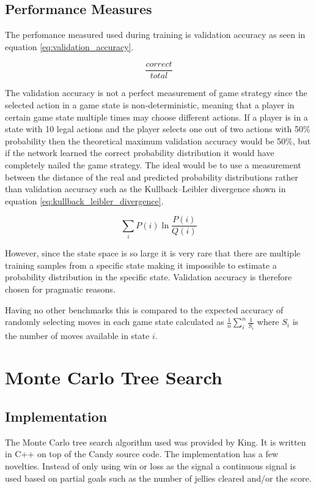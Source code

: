 \documentclass{kththesis}
\begin{document}
\subsection{Performance Measures}
The perfomance measured used during training is validation accuracy as seen in equation \ref{eq:validation_accuracy}. 

\begin{equation}
\label{eq:validation_accuracy}
\frac{correct}{total}
\end{equation}

The validation accuracy is not a perfect measurement of game strategy since the selected action in a game state is non-deterministic, meaning that a player in  certain game state multiple times may choose different actions. If a player is in a state with 10 legal actions and the player selects one out of two actions with 50\% probability then the theoretical maximum validation accuracy would be 50\%, but if the network learned the correct probability distribution it would have completely nailed the game strategy. The ideal would be to use a measurement between the distance of the real and predicted probability distributions rather than validation accuracy such as the Kullback–Leibler divergence shown in equation \ref{eq:kullback_leibler_divergence}.

\begin{equation}
\label{eq:kullback_leibler_divergence}
\sum_i P(i)\ln\frac{P(i)}{Q(i)}
\end{equation}

However, since the state space is so large it is very rare that there are multiple training samples from a specific state making it impossible to estimate a probability distribution in the specific state. Validation accuracy is therefore chosen for pragmatic reasons.

Having no other benchmarks this  is compared to the expected accuracy of randomly selecting moves in each game state calculated as $\frac{1}{n}\sum_i^n\frac{1}{S_{i}}$ where $S_{i}$ is the number of moves available in state $i$.


\section{Monte Carlo Tree Search}
\subsection{Implementation}
The Monte Carlo tree search algorithm used was provided by King. It is written in C++ on top of the Candy source code. The implementation has a few novelties. Instead of only using win or loss as the signal a  continuous signal is used based on partial goals such as the number of jellies cleared and/or the score. 
\end{document}
